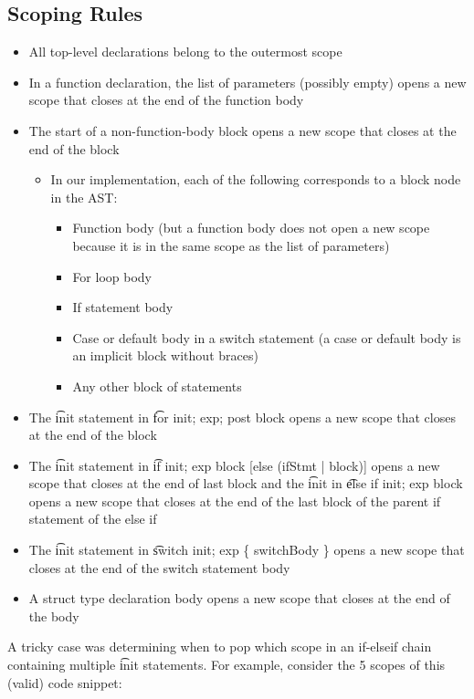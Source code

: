 \documentclass[11pt]{article}
\begin{document}
\subsection*{Scoping Rules}
\begin{itemize}
\item All top-level declarations belong to the outermost scope	
\item In a function declaration,  the list of parameters (possibly empty) opens a new scope that closes at the end of the function body
\item The start of a non-function-body block opens a new scope that closes at the end of the block
	\begin{itemize}
	\item In our implementation, each of the following corresponds to a block node in the AST:
	\begin{itemize}
	\item Function body (but a function body does not open a new scope because it is in the same scope as the list of parameters)
	\item For loop body
	\item If statement body
	\item Case or default body in a switch statement (a case or default body is an implicit block without braces)
	\item Any other block of statements
	\end{itemize}
	\end{itemize}
\item The \t{init} statement in \t{for init; exp; post block} opens a new scope that closes at the end of the block
\item The \t{init} statement in \t{if init; exp block [else (ifStmt | block)]} opens a new scope that closes at the end of last block and the \t{init} in \t{else if init; exp block} opens a new scope that closes at the end of the last block of the parent if statement of the else if
\item The \t{init} statement in \t{switch init; exp \{ switchBody \}} opens a new scope that closes at the end of the switch statement body
\item A struct type declaration body opens a new scope that closes at the end of the body
\end{itemize}
A tricky case was determining when to pop which scope in an if-elseif chain containing multiple \t{init} statements. For example, consider the 5 scopes of this (valid) code snippet:\\ \ \\
\end{document}
